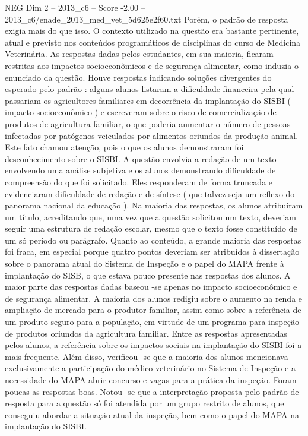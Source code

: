 \begin{textsample}{NEG Dim 2 – 2013\_c6 – Score -2.00 – 2013\_c6/enade\_2013\_med\_vet\_5d625e2f60.txt}
Porém, o padrão de resposta exigia mais do que isso.
O contexto utilizado na questão era bastante pertinente, atual e previsto nos conteúdos programáticos de disciplinas do curso de Medicina Veterinária.
As respostas dadas pelos estudantes, em sua maioria, ficaram restritas aos impactos socioeconômicos e de segurança alimentar, como induzia o enunciado da questão.
Houve respostas indicando soluções divergentes do esperado pelo padrão : alguns alunos listaram a dificuldade financeira pela qual passariam os agricultores familiares em decorrência da implantação do SISBI ( impacto socioeconômico ) e escreveram sobre o risco de comercialização de produtos de agricultura familiar, o que poderia aumentar o número de pessoas infectadas por patógenos veiculados por alimentos oriundos da produção animal.
Este fato chamou atenção, pois o que os alunos demonstraram foi desconhecimento sobre o SISBI.
A questão envolvia a redação de um texto envolvendo uma análise subjetiva e os alunos demonstrando dificuldade de compreensão do que foi solicitado.
Eles responderam de forma truncada e evidenciaram dificuldade de redação e de síntese ( que talvez seja um reflexo do panorama nacional da educação ).
Na maioria das respostas, os alunos atribuíram um título, acreditando que, uma vez que a questão solicitou um texto, deveriam seguir uma estrutura de redação escolar, mesmo que o texto fosse constituído de um só período ou parágrafo.
Quanto ao conteúdo, a grande maioria das respostas foi fraca, em especial porque quatro pontos deveriam ser atribuídos à dissertação sobre o panorama atual do Sistema de Inspeção e o papel do MAPA frente à implantação do SISB, o que estava pouco presente nas respostas dos alunos.
A maior parte das respostas dadas baseou -se apenas no impacto socioeconômico e de segurança alimentar.
A maioria dos alunos redigiu sobre o aumento na renda e ampliação de mercado para o produtor familiar, assim como sobre a referência de um produto seguro para a população, em virtude de um programa para inspeção de produtos oriundos da agricultura familiar.
Entre as respostas apresentadas pelos alunos, a referência sobre os impactos sociais na implantação do SISBI foi a mais frequente.
Além disso, verificou -se que a maioria dos alunos mencionava exclusivamente a participação do médico veterinário no Sistema de Inspeção e a necessidade do MAPA abrir concurso e vagas para a prática da inspeção.
Foram poucas as respostas boas.
Notou -se que a interpretação proposta pelo padrão de resposta para a questão só foi atendida por um grupo restrito de alunos, que conseguiu abordar a situação atual da inspeção, bem como o papel do MAPA na implantação do SISBI.

\end{textsample}
